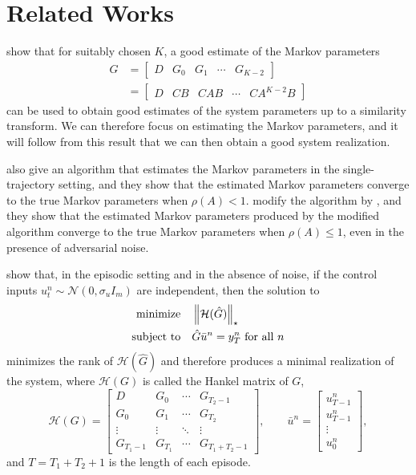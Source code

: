 \section{Related Works}

\cite{oymak2019singletraj} show
that for suitably chosen $K$, a good estimate of the Markov parameters
\begin{align*}
G &= \begin{bmatrix} D & G_0 & G_1 & \cdots & G_{K-2} \end{bmatrix} \\
&= \begin{bmatrix} D & CB & CAB & \cdots & C A^{K-2} B \end{bmatrix}
\end{align*}
can be used to obtain good estimates of the system parameters
up to a similarity transform.
We can therefore focus on estimating the Markov parameters,
and it will follow from this result
that we can then obtain a good system realization.

\cite{oymak2019singletraj} also give
an algorithm that estimates the Markov parameters in the single-trajectory setting,
and they show that the estimated Markov parameters
converge to the true Markov parameters when $\rho(A) < 1$.
\cite{simchowitz2019parametric} modify
the algorithm by \cite{oymak2019singletraj},
and they show that the estimated Markov parameters produced by the modified algorithm
converge to the true Markov parameters when $\rho(A) \le 1$,
even in the presence of adversarial noise.

\cite{recht2010lowrank} show that,
in the episodic setting and in the absence of noise,
if the control inputs $u_t^n \sim \mathcal N (0, \sigma_u I_m)$
are independent,
then the solution to
\begin{align*}
  \text{minimize}\quad &\left\Vert{\mathcal H (\hat G)}\right\Vert_\star \\
  \text{subject to}\quad & \hat G \bar u^n = y^n_T \text{ for all $n$}
\end{align*}
minimizes the rank of $\mathcal H(\hat G)$ and therefore
produces a minimal realization of the system,
where
$\mathcal H(G)$ is called the Hankel matrix of $G$,
\[
  \mathcal H(G) = \begin{bmatrix}
    D & G_0 & \cdots & G_{T_2-1} \\
    G_0 & G_1 & \cdots & G_{T_2} \\
    \vdots & \vdots & \ddots & \vdots \\
    G_{T_1-1} & G_{T_1} & \cdots & G_{T_1 + T_2 - 1}
  \end{bmatrix},
  \qquad
  \bar u ^n = \begin{bmatrix} u^n_{T-1} \\ u^n_{T-1} \\ \vdots \\ u^n_0 \end{bmatrix},
\]
and $T = T_1 + T_2 + 1$ is the length of each episode.

